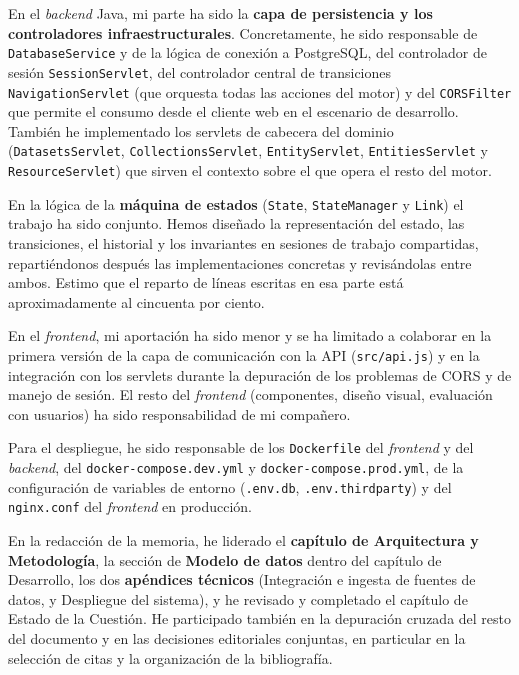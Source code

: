 En el \textit{backend} Java, mi parte ha sido la \textbf{capa de persistencia y los controladores
infraestructurales}. Concretamente, he sido responsable de \texttt{Database\allowbreak Service}
y de la lógica de conexión a PostgreSQL, del controlador de sesión \texttt{Session\allowbreak Servlet},
del controlador central de transiciones \texttt{Navigation\allowbreak Servlet} (que orquesta todas
las acciones del motor) y del \texttt{CORSFilter} que permite el consumo desde el cliente web
en el escenario de desarrollo. También he implementado los servlets de cabecera del dominio
(\texttt{DatasetsServlet}, \texttt{CollectionsServlet}, \texttt{EntityServlet},
\texttt{EntitiesServlet} y \texttt{ResourceServlet}) que sirven el contexto sobre el que opera
el resto del motor.

En la lógica de la \textbf{máquina de estados} (\texttt{State}, \texttt{StateManager} y
\texttt{Link}) el trabajo ha sido conjunto. Hemos diseñado la representación del estado, las
transiciones, el historial y los invariantes en sesiones de trabajo compartidas, repartiéndonos
después las implementaciones concretas y revisándolas entre ambos. Estimo que el reparto de
líneas escritas en esa parte está aproximadamente al cincuenta por ciento.

En el \textit{frontend}, mi aportación ha sido menor y se ha limitado a colaborar en la primera versión
de la capa de comunicación con la API (\texttt{src/api.js}) y en la integración con los servlets
durante la depuración de los problemas de CORS y de manejo de sesión. El resto del \textit{frontend}
(componentes, diseño visual, evaluación con usuarios) ha sido responsabilidad de mi compañero.

Para el despliegue, he sido responsable de los \texttt{Dockerfile} del \textit{frontend} y del \textit{backend},
del \texttt{docker-compose.dev.yml} y \texttt{docker-compose.prod.yml}, de la configuración de
variables de entorno (\texttt{.env.db}, \texttt{.env.thirdparty}) y del \texttt{nginx.conf} del
\textit{frontend} en producción.

En la redacción de la memoria, he liderado el \textbf{capítulo de Arquitectura y Metodología},
la sección de \textbf{Modelo de datos} dentro del capítulo de Desarrollo, los dos
\textbf{apéndices técnicos} (Integración e ingesta de fuentes de datos, y Despliegue del
sistema), y he revisado y completado el capítulo de Estado de la Cuestión. He participado
también en la depuración cruzada del resto del documento y en las decisiones editoriales
conjuntas, en particular en la selección de citas y la organización de la bibliografía.

